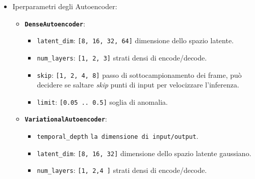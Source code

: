 \begin{itemize}
\begin{itemize}
	\item[\(\bullet\)] \textbf{\texttt{Conv1DRouter}} (Convoluzione 1D + Testa Densa):
	\begin{itemize}
		\item[\(\ast\)] \texttt{filters}: \texttt{[8, 16, 32]} filtri convoluzionali (kernel 3).
		\item[\(\ast\)] \texttt{hidden\_units}: \texttt{[16, 32, 64]} neuroni nello strato denso.
		\item[\(\ast\)] \texttt{learning\_rate}: \texttt{1e-4 .. 1e-2}.
	\end{itemize}

	\item[\(\bullet\)] \textbf{\texttt{STFTMCNNRouter}} (Multi-Branch CNN + Fusione Densa):
	\begin{itemize}
		\item[\(\ast\)] \texttt{branch\_filters}: \texttt{[8, 16, 32]} filtri paralleli per ciascuno dei 3 rami (kernel 3, 5 e 7).
		\item[\(\ast\)] \texttt{hidden\_units}: \texttt{[16, 32, 64]} neuroni dello strato denso finale.
		\item[\(\ast\)] \texttt{learning\_rate}: \texttt{1e-4 .. 1e-2}.
	\end{itemize}
\end{itemize}

	\item[\(\circ\)] Iperparametri degli Autoencoder:
	\begin{itemize}
		\item[\(\bullet\)] \textbf{\texttt{DenseAutoencoder}}:
		\begin{itemize}
			\item[\(\ast\)] \texttt{latent\_dim}: \texttt{[8, 16, 32, 64]} dimensione dello spazio latente.
			\item[\(\ast\)] \texttt{num\_layers}: \texttt{[1, 2, 3]} strati densi di encode/decode.
			\item[\(\ast\)] \texttt{skip}: \texttt{[1, 2, 4, 8]} passo di sottocampionamento dei frame, può decidere se saltare \textit{skip} punti di input per velocizzare l'inferenza.

			\item[\(\ast\)] \texttt{limit}: \texttt{[0.05 .. 0.5]} soglia di anomalia.
		\end{itemize}

		\item[\(\bullet\)] \textbf{\texttt{VariationalAutoencoder}}:
		\begin{itemize}
			\item[\(\ast\)] \texttt{temporal\_depth} \texttt{la dimensione di input/output}.
			\item[\(\ast\)] \texttt{latent\_dim}: \texttt{[8, 16, 32]} dimensione dello spazio latente gaussiano.
			\item[\(\ast\)] \texttt{num\_layers}: \texttt{[1, 2,4 ]} strati densi di encode/decode.


\end{itemize}
\end{itemize}
\end{itemize}
